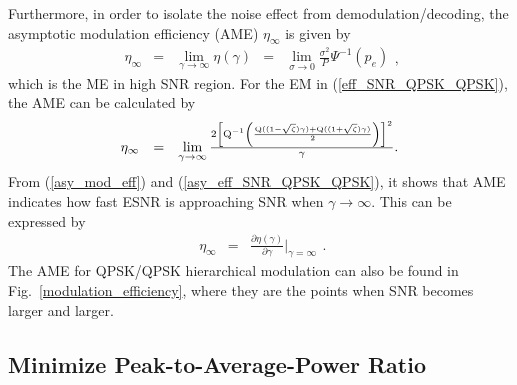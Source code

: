 \documentclass[conference]{IEEEtran}
\begin{document}
Furthermore, in order to isolate the noise effect from
demodulation/decoding, the asymptotic modulation efficiency (AME)
$\eta_{\infty}$ is given by
\begin{equation}
\begin{array}{rcccl}
\eta_{\infty}&=&\lim\limits_{\gamma\rightarrow\infty}\eta\left(\gamma\right)&=&\lim\limits_{\sigma\rightarrow0}\frac{\sigma^2}{P}\Psi^{-1}\left(p_{e}\right)
\end{array},\label{asy_mod_eff}
\end{equation}
\noindent which is the ME in high SNR region. For the EM in
(\ref{eff_SNR_QPSK_QPSK}), the AME can be calculated by
\begin{equation}%
\begin{array}{rcl}
\eta_{\infty}&=&\lim\limits_{\gamma\rightarrow\infty}\frac{2\left[{\rm
Q}^{-1}\left(\frac{{\rm Q}((1-\sqrt{\zeta})\gamma)+{\rm
Q}((1+\sqrt{\zeta})\gamma)}{2}\right)\right]^2}{\gamma}.
\end{array}\label{asy_eff_SNR_QPSK_QPSK}
\end{equation}
\noindent From (\ref{asy_mod_eff}) and
(\ref{asy_eff_SNR_QPSK_QPSK}), it shows that AME indicates how
fast ESNR is approaching SNR when $\gamma\rightarrow\infty$. This
can be expressed by
\begin{equation}
\begin{array}{rcl}
\eta_{\infty}&=&\frac{\partial\eta\left(\gamma\right)}{\partial\gamma}|_{\gamma=\infty}
\end{array}.\label{asy_mod_eff2}
\end{equation}
\noindent The AME for QPSK/QPSK hierarchical modulation can also
be found in Fig.~\ref{modulation_efficiency}, where they are the
points when SNR becomes larger and larger.

\subsection{Minimize Peak-to-Average-Power Ratio}
\end{document}
